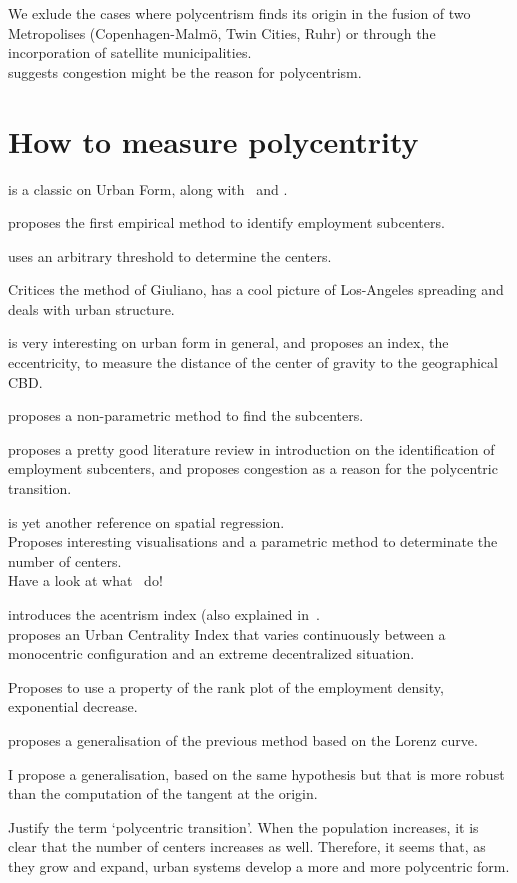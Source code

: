 We exlude the cases where polycentrism finds its origin in the fusion of two
Metropolises (Copenhagen-Malm\"o, Twin Cities, Ruhr) or through the
incorporation of satellite municipalities.\\


\cite{McMillen:2003} suggests congestion might be the reason for polycentrism.



\section{How to measure polycentrity}
\label{sec:how_to_measure_polycentrity}

\cite{Tsai:2005} is a classic on Urban Form, along with~\cite{LeNechet:2015} and
\cite{Schwarz:2010}.

\cite{McDonald:1987} proposes the first empirical method to identify employment
subcenters.

\cite{Giuliano:1991} uses an arbitrary threshold to determine the centers.

\cite{Anas:1998} Critices the method of Giuliano, has a cool picture of
Los-Angeles spreading and deals with urban structure.

\cite{Bertaud:2001} is very interesting on urban form in general, and proposes
an index, the eccentricity, to measure the distance of the center of gravity to
the geographical CBD.


\cite{McMillen:2001} proposes a non-parametric method to find the subcenters.

\cite{McMillen:2003} proposes a pretty good literature review in introduction on
the identification of employment subcenters, and proposes congestion as a reason
for the polycentric transition.


\cite{Griffith:2007} is yet another reference on spatial regression.\\

\cite{Redfearn:2007} Proposes interesting visualisations and a parametric method
to determinate the number of centers.\\

Have a look at what~\cite{Berroir:2008} do!


\cite{LeNechet:2010} introduces the acentrism index (also explained
in~\cite{LeNechet:2015}.\\

\cite{Pereira:2013} proposes an Urban Centrality Index that varies continuously
between a monocentric configuration and an extreme decentralized situation.

\cite{Louf:2013_polycentric} Proposes to use a property of the rank plot of the
employment density, exponential decrease.

\cite{Louail:2014} proposes a generalisation of the previous method based on the
Lorenz curve.

I propose a generalisation, based on the same hypothesis but that is more robust
than the computation of the tangent at the origin.

Justify the term `polycentric transition'. When the population increases, it is
clear that the number of centers increases as well. Therefore, it seems that, as
they grow and expand, urban systems develop a more and more polycentric form.
